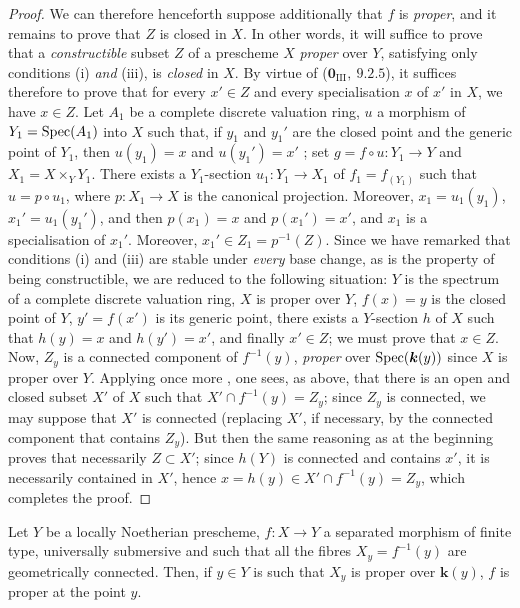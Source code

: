 \begin{proof}
We can therefore henceforth suppose additionally that $f$ is \emph{proper}, and it remains to prove that $Z$ is closed in $X$.
In other words, it will suffice to prove that a \emph{constructible} subset $Z$ of a prescheme $X$ \emph{proper} over $Y$, satisfying only conditions (i) \emph{and} (iii), is \emph{closed} in $X$.
By virtue of ($\mathbf{0}_{\mathrm{III}},~9.2.5$), it suffices therefore to prove that for every $x'\in Z$ and every specialisation $x$ of $x'$ in $X$, we have $x\in Z$.
Let $A_1$ be a complete discrete valuation ring, $u$ a morphism of $Y_1=\operatorname{Spec}(A_1)$ into $X$ such that, if $y_1$ and $y_1'$ are the closed point and the generic point of $Y_1$, then $u(y_1)=x$ and $u(y_1')=x'$ ; set $g=f\circ u:Y_1\to Y$ and $X_1=X\times_Y Y_1$. There exists a $Y_1$-section $u_1:Y_1\to X_1$ of $f_1=f_{(Y_1)}$ such that $u=p\circ u_1$, where $p:X_1\to X$ is the canonical projection.
Moreover, $x_1=u_1(y_1)$, $x_1'=u_1(y_1')$, and then $p(x_1)=x$ and $p(x_1')=x'$, and $x_1$ is a specialisation of $x_1'$.
Moreover, $x_1'\in Z_1=p^{-1}(Z)$. Since we have remarked that conditions (i) and (iii) are stable under \emph{every} base change, as is the property of being constructible, we are reduced to the following situation: $Y$ is the spectrum of a complete discrete valuation ring, $X$ is proper over $Y$, $f(x)=y$ is the closed point of $Y$, $y'=f(x')$ is its generic point, there exists a $Y$-section $h$ of $X$ such that $h(y)=x$ and $h(y')=x'$, and finally $x'\in Z$; we must prove that $x\in Z$.
Now, $Z_y$ is a connected component of $f^{-1}(y)$, \emph{proper} over $\operatorname{Spec}(\boldsymbol{k}(y))$ since $X$ is proper over $Y$.
Applying once more , one sees, as above, that there is an open and closed subset $X'$ of $X$ such that $X'\cap f^{-1}(y)=Z_y$; since $Z_y$ is connected,
we may suppose that $X'$ is connected (replacing $X'$, if necessary, by the connected component that contains $Z_y$).
But then the same reasoning as at the beginning proves that necessarily $Z\subset X'$; since $h(Y)$ is connected and contains $x'$, it is necessarily contained in $X'$, hence $x=h(y)\in X'\cap f^{-1}(y)=Z_y$, which completes the proof.
\end{proof}

\begin{corollary}[15.7.10]
\label{IV.15.7.10}
Let $Y$ be a locally Noetherian prescheme, $f:X\to Y$ a separated morphism of finite type, universally submersive  and such that all the fibres $X_y=f^{-1}(y)$ are geometrically connected.
Then, if $y\in Y$ is such that $X_y$ is proper over $\boldsymbol{k}(y)$, $f$ is proper at the point $y$.
\end{corollary}

